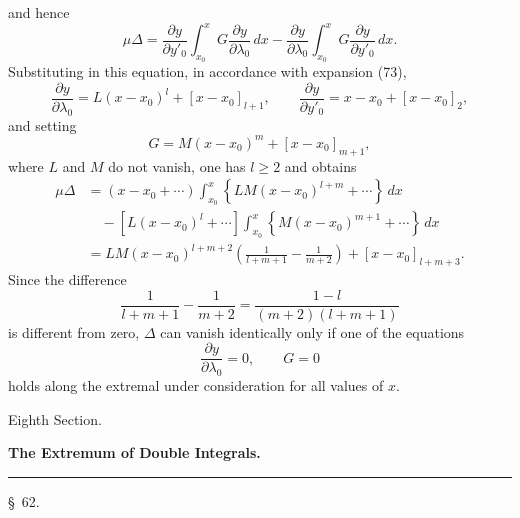 \documentclass[11pt,a4paper,leqno]{article}
\begin{document}
and hence
\[
\mu\Delta=
\frac{\partial y}{\partial y'_0}
\int_{x_0}^{x}G\frac{\partial y}{\partial\lambda_0}\,dx
-\frac{\partial y}{\partial\lambda_0}
\int_{x_0}^{x}G\frac{\partial y}{\partial y'_0}\,dx.
\]
Substituting in this equation, in accordance with expansion (73),
\[
\frac{\partial y}{\partial\lambda_0}
=L(x-x_0)^l+[x-x_0]_{l+1},\qquad
\frac{\partial y}{\partial y'_0}=x-x_0+[x-x_0]_2,
\]
and setting
\[
G=M(x-x_0)^m+[x-x_0]_{m+1},
\]
where $L$ and $M$ do not vanish, one has $l\geq 2$ and obtains
\[
\begin{aligned}
\mu\Delta
&=(x-x_0+\cdots)
\int_{x_0}^{x}\left\{LM(x-x_0)^{l+m}+\cdots\right\}\,dx\\
&\quad-[L(x-x_0)^l+\cdots]
\int_{x_0}^{x}\left\{M(x-x_0)^{m+1}+\cdots\right\}\,dx\\
&=LM(x-x_0)^{l+m+2}
\left(\frac{1}{l+m+1}-\frac{1}{m+2}\right)
+[x-x_0]_{l+m+3}.
\end{aligned}
\]
Since the difference
\[
\frac{1}{l+m+1}-\frac{1}{m+2}
=\frac{1-l}{(m+2)(l+m+1)}
\]
is different from zero, $\Delta$ can vanish identically only if one of the equations
\[
\frac{\partial y}{\partial\lambda_0}=0,\qquad G=0
\]
holds along the extremal under consideration for all values of $x$.


\begin{center}
{\large Eighth Section.}\par\vspace{1.5em}
{\Large\bfseries The Extremum of Double Integrals.}\par\vspace{1.4em}
\rule{2.4cm}{0.4pt}\par\vspace{1.5em}
{\large \S~62.}
\end{center}
\end{document}

